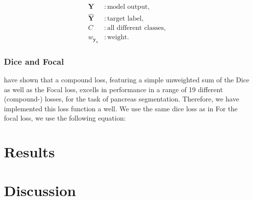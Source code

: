 \documentclass[12pt]{article}
\begin{document}
\begin{align*}
    \mathbf{Y}          &: \text{model output}, \\
    \hat{\mathbf{Y}}    &: \text{target label}, \\
    C                   &: \text{all different classes}, \\
    w_{\mathbf{y}_n}    &: \text{weight}.
\end{align*}


\subsubsection{Dice and Focal}
\citeauthor{MA2021102035} have shown that a compound loss, featuring a simple unweighted sum of the Dice as well as the 
Focal loss, excells in performance in a range of 19 different (compound-) losses, for the task of pancreas segmentation.
Therefore, we have implemented this loss function a well. We use the same dice loss as in %
For the focal loss, we use the following equation:


\section{Results}
\section{Discussion}
\printbibliography
\end{document}
